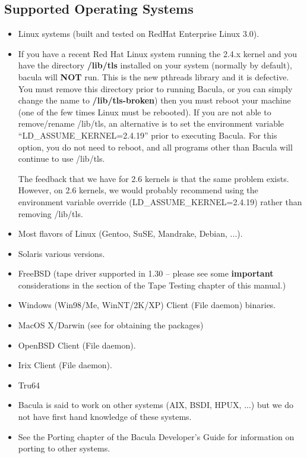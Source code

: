 \subsection*{Supported Operating Systems}
\label{SupportedOSes}

\begin{itemize}
\item Linux systems (built and tested on RedHat Enterprise Linux 3.0).  
\item If you have a recent Red Hat Linux system running the 2.4.x kernel  and
you have the directory {\bf /lib/tls} installed on your  system (normally by
default), bacula will {\bf NOT} run. This is  the new pthreads library and it
is defective. You must remove  this directory prior to running Bacula, or you
can simply change  the name to {\bf /lib/tls-broken}) then you must reboot
your  machine (one of the few times Linux must be rebooted). If  you are not
able to remove/rename /lib/tls, an alternative is to  set the environment
variable ``LD\_ASSUME\_KERNEL=2.4.19'' prior to  executing Bacula. For this
option, you do not need to reboot, and  all programs other than Bacula will
continue to use /lib/tls.  

The feedback that we have for 2.6 kernels is that the  same problem exists.
However, on 2.6 kernels, we would  probably recommend using the environment
variable override  (LD\_ASSUME\_KERNEL=2.4.19) rather than removing /lib/tls. 

\item Most flavors of Linux (Gentoo, SuSE, Mandrake, Debian, ...).  
\item Solaris various versions.  
\item FreeBSD (tape driver supported in 1.30 -- please see some  {\bf
important} considerations in the 
  section of the
Tape Testing chapter of this manual.)  
\item Windows (Win98/Me, WinNT/2K/XP) Client (File daemon) binaries.  
\item MacOS X/Darwin (see 
 for
obtaining the packages)  
\item OpenBSD Client (File daemon).  
\item Irix Client (File daemon).  
\item Tru64  
\item Bacula is said to work on other systems (AIX, BSDI, HPUX,  ...) but we
do not have first hand knowledge  of these systems.  
\item See the Porting chapter of the Bacula Developer's Guide  for information
on porting to other systems. 
\end{itemize}

